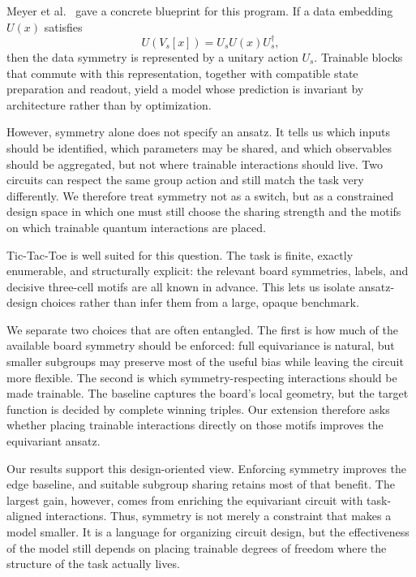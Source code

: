 Meyer et al.~\cite{meyer2023symmetry} gave a concrete blueprint for this
program. If a data embedding \(U(x)\) satisfies
\[
    U(V_s[x]) = U_s U(x) U_s^\dagger ,
\]
then the data symmetry is represented by a unitary action \(U_s\). Trainable
blocks that commute with this representation, together with compatible state
preparation and readout, yield a model whose prediction is invariant by
architecture rather than by optimization.

However, symmetry alone does not specify an ansatz. It tells us which inputs
should be identified, which parameters may be shared, and which observables
should be aggregated, but not where trainable interactions should live. Two
circuits can respect the same group action and still match the task very
differently. We therefore treat symmetry not as a switch, but as a constrained
design space in which one must still choose the sharing strength and the motifs
on which trainable quantum interactions are placed.

Tic-Tac-Toe is well suited for this question. The task is finite,
exactly enumerable, and structurally explicit: the relevant board
symmetries, labels, and decisive three-cell motifs are all known in advance.
This lets us isolate ansatz-design choices rather than infer them from a
large, opaque benchmark.

We separate two choices that are often entangled. The first is how much of the
available board symmetry should be enforced: full equivariance is natural, but
smaller subgroups may preserve most of the useful bias while leaving the
circuit more flexible. The second is which symmetry-respecting interactions
should be made trainable. The baseline captures the board's local geometry,
but the target function is decided by complete winning triples. Our
extension therefore asks whether placing trainable interactions directly on
those motifs improves the equivariant ansatz.

Our results support this design-oriented view. Enforcing symmetry improves the
edge baseline, and suitable subgroup sharing retains most of that benefit. The
largest gain, however, comes from enriching the equivariant circuit with
task-aligned interactions. Thus, symmetry is not merely a constraint that makes
a model smaller. It is a language for organizing circuit design, but the
effectiveness of the model still depends on placing trainable degrees of
freedom where the structure of the task actually lives.
